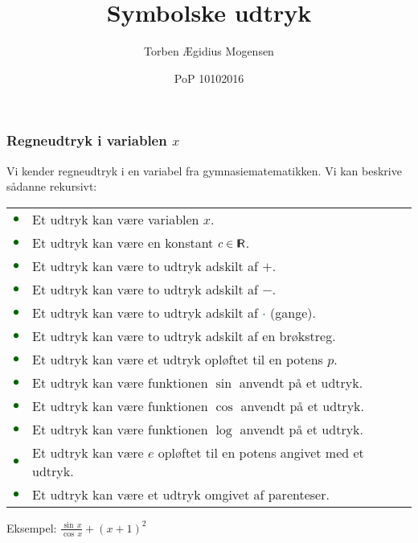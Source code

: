 \documentclass{beamer}
\title{Symbolske udtryk}
\date[2016]{PoP 10102016}
\author{Torben Ægidius Mogensen}
\begin{document}
\begin{frame}
\titlepage
\end{frame}






\begin{frame}%
\frametitle{Regneudtryk i variablen $x$}

Vi kender regneudtryk i en variabel fra gymnasiematematikken.  Vi kan
beskrive sådanne rekursivt:

\vspace{1ex}

\begin{tabular}{@{~}c@{~}l}
\textcolor{darkgreen}{$\bullet$} & Et udtryk kan være variablen $x$.\\
\textcolor{darkgreen}{$\bullet$} & Et udtryk kan være en konstant $c \in \textsf{I\!R}$.\\
\textcolor{darkgreen}{$\bullet$} & Et udtryk kan være to udtryk adskilt af $+$.\\
\textcolor{darkgreen}{$\bullet$} & Et udtryk kan være to udtryk adskilt af $-$.\\
\textcolor{darkgreen}{$\bullet$} & Et udtryk kan være to udtryk adskilt af \textcolor{darkgreen}{$\cdot$} (gange).\\
\textcolor{darkgreen}{$\bullet$} & Et udtryk kan være to udtryk adskilt af en brøkstreg.\\
\textcolor{darkgreen}{$\bullet$} & Et udtryk kan være et udtryk opløftet til en
  potens $p$.\\
\textcolor{darkgreen}{$\bullet$} & Et udtryk kan være funktionen $\sin$ anvendt på et udtryk.\\
\textcolor{darkgreen}{$\bullet$} & Et udtryk kan være funktionen $\cos$ anvendt på et udtryk.\\
\textcolor{darkgreen}{$\bullet$} & Et udtryk kan være funktionen $\log$ anvendt på et udtryk.\\
\textcolor{darkgreen}{$\bullet$} & Et udtryk kan være $e$
opløftet til en potens angivet med et udtryk.\\
\textcolor{darkgreen}{$\bullet$} & Et udtryk kan være et udtryk
omgivet af parenteser.
\end{tabular}


\vspace{1ex}
Eksempel: $\frac{\sin\,x}{\cos\,x}+(x+1)^2$

\end{frame}
\end{document}
